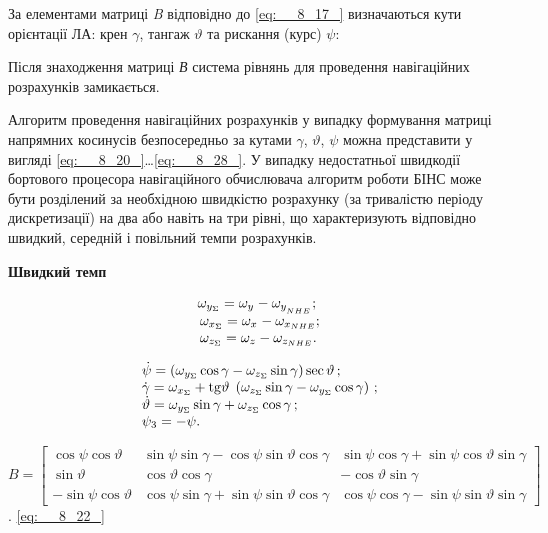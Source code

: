 За елементами матриці  \textit{B} відповідно до \eqref{eq:__8_17_} визначаються 
кути орієнтації ЛА:  крен $\gamma $, тангаж $\vartheta$ та рискання (курс) $\psi $: 

Після знаходження матриці \textit{В} система рівнянь для проведення навігаційних 
розрахунків замикається. 

Алгоритм проведення навігаційних розрахунків у випадку формування матриці напрямних  
косинусів безпосередньо за кутами  $\gamma$, $\vartheta$, $\psi$ можна представити 
у вигляді \eqref{eq:__8_20_}\dots \eqref{eq:__8_28_}. У випадку недостатньої 
швидкодії бортового процесора навігаційного обчислювача алгоритм роботи БІНС може 
бути розділений за необхідною швидкістю розрахунку (за тривалістю періоду дискретизації) 
на два або навіть на три рівні, що характеризують відповідно швидкий, середній і 
повільний темпи розрахунків. 


\textbf{Швидкий темп}

\begin{equation} \label{eq:__8_20_} \begin{array}{l} {\omega_{y_{\Sigma } } 
=\omega_{y_{{\rm }} } -\omega_{y_{_{NHE} } } ;\, } \\ {\, \omega_{x_{\Sigma } 
} =\omega_{x_{{\rm }} } -\omega_{x_{NHE} } ;\, } \\ {\, \omega_{z_{\Sigma } } 
=\omega_{z_{{\rm }} } -\omega_{z_{NHE} } .} \end{array} \end{equation} 



\begin{equation} \label{eq:__8_21_} \begin{array}{l} {\dot{\psi }=\left(\omega 
_{y_{\Sigma } } \cos \gamma -\omega_{z_{\Sigma } } \sin \gamma \right)\sec \vartheta 
\, ;} \\ {\dot{\gamma }=\omega_{x_{\Sigma } } +{\rm tg}\vartheta {\rm \; }\left(
\omega_{z_{\Sigma } } \sin \gamma -\omega_{y_{\Sigma } } \cos \gamma \right)\, 
;} \\ {\dot{\vartheta }=\omega_{y_{\Sigma } } \sin \gamma +\omega_{z_{\Sigma }
} \cos \gamma \, ;} \\ {\psi_{{\rm 3}} =-\psi .} \end{array} \end{equation} 




$B=\left[\begin{array}{ccc} {\cos \psi \cos \vartheta } & {\sin \psi \sin 
\gamma -\cos \psi \sin \vartheta \cos \gamma } & {\sin \psi \cos \gamma +\sin \psi 
\cos \vartheta \sin \gamma } \\ {\sin \vartheta } & {\cos \vartheta \cos \gamma } 
& {-\cos \vartheta \sin \gamma } \\ {-\sin \psi \cos \vartheta } & {\cos \psi \sin 
\gamma +\sin \psi \sin \vartheta \cos \gamma } & {\cos \psi \cos \gamma -\sin \psi 
\sin \vartheta \sin \gamma } \end{array}\right]$. \eqref{eq:__8_22_}


